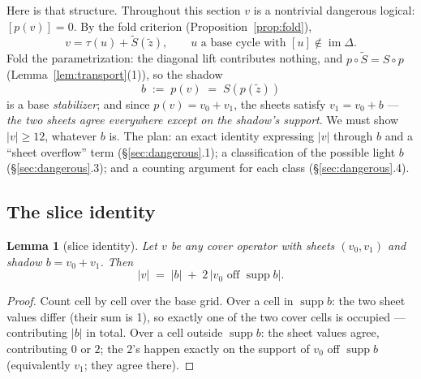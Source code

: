 \documentclass[11pt]{article}
\theoremstyle{plain}
\newtheorem{lemma}[theorem]{Lemma}
\theoremstyle{definition}
\theoremstyle{remark}
\newcommand{\suppop}{\operatorname{supp}}
\newcommand{\imD}{\operatorname{im}\Delta}
\newcommand{\wt}[1]{\lvert #1\rvert}
\begin{document}
Here is that structure. Throughout this section $v$ is a nontrivial
dangerous logical: $[p(v)] = 0$. By the fold criterion
(Proposition~\ref{prop:fold}),
\[
v = \tau(u) + \widetilde S(\widetilde z), \qquad u \text{ a base cycle with }
[u] \notin \imD .
\]
Fold the parametrization: the diagonal lift contributes nothing, and
$p \circ \widetilde S = S \circ p$ (Lemma~\ref{lem:transport}(1)), so the
shadow
\[
b \;:=\; p(v) \;=\; S(p(\widetilde z))
\]
is a base \emph{stabilizer}; and since $p(v) = v_0 + v_1$, the sheets
satisfy $v_1 = v_0 + b$ --- \emph{the two sheets agree everywhere except on
the shadow's support}. We must show $\wt{v} \geq 12$, whatever $b$ is. The
plan: an exact identity expressing $\wt{v}$ through $b$ and a ``sheet
overflow'' term (\S\ref{sec:dangerous}.1); a classification of the possible
light $b$ (\S\ref{sec:dangerous}.3); and a counting argument for each class
(\S\ref{sec:dangerous}.4).

\subsection{The slice identity}

\begin{lemma}[slice identity]\label{lem:slice}
Let $v$ be any cover operator with sheets $(v_0, v_1)$ and shadow $b = v_0 +
v_1$. Then
\[
\wt{v} \;=\; \wt{b} \;+\; 2\,\wt{v_0 \text{ off } \suppop b}.
\]
\end{lemma}

\begin{proof}
Count cell by cell over the base grid. Over a cell in $\suppop b$: the two
sheet values differ (their sum is 1), so exactly one of the two cover cells is
occupied --- contributing $\wt{b}$ in total. Over a cell outside $\suppop b$:
the sheet values agree, contributing $0$ or $2$; the $2$'s happen exactly on
the support of $v_0$ off $\suppop b$ (equivalently $v_1$; they agree there).
\end{proof}
\end{document}
